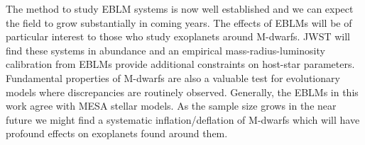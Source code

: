 The method to study EBLM systems is now well established and we can expect the field to grow substantially in coming years. The effects of EBLMs will be of particular interest to those who study exoplanets around M-dwarfs. JWST will find these systems in abundance and an empirical mass-radius-luminosity calibration from EBLMs provide additional constraints on host-star parameters. Fundamental properties of M-dwarfs are also a valuable test for evolutionary models where discrepancies are routinely observed. Generally, the EBLMs in this work agree with MESA stellar models. As the sample size grows in the near future we might find a systematic inflation/deflation of M-dwarfs which will have profound effects on exoplanets found around them. 







    
